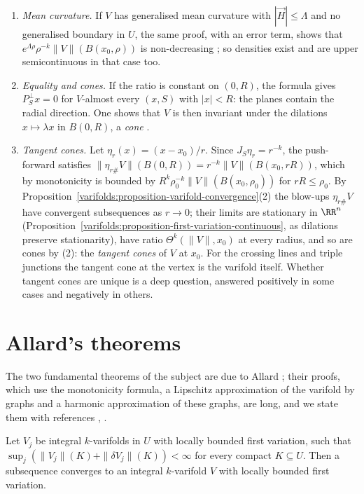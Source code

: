 \begin{remark}\label{varifolds:remark-monotonicity}
\begin{enumerate}
\item \emph{Mean curvature.} If $V$ has generalised mean curvature with $|\vec{H}| \leq \Lambda$ and no generalised boundary in $U$, the same proof, with an error term, shows that
$e^{\Lambda\rho}\rho^{-k}\|V\|(B(x_0, \rho))$ is non-decreasing \cite{simon-gmt}; so densities exist and are upper semicontinuous in that case too.
\item \emph{Equality and cones.} If the ratio is constant on $(0, R)$, the formula gives $P_S^\perp x = 0$ for $V$-almost every $(x, S)$ with $|x| < R$: the planes contain the radial direction. One shows that
$V$ is then invariant under the dilations $x \mapsto \lambda x$ in $B(0, R)$, a \emph{cone} \cite{simon-gmt}.
\item \emph{Tangent cones.} Let $\eta_r(x) = (x - x_0)/r$. Since $J_S\eta_r = r^{-k}$, the push-forward satisfies $\|\eta_{r\#}V\|(B(0, R)) = r^{-k}\|V\|(B(x_0, rR))$, which by monotonicity is bounded by
$R^k\rho_0^{-k}\|V\|(B(x_0, \rho_0))$ for $rR \leq \rho_0$. By Proposition~\ref{varifolds:proposition-varifold-convergence}(2) the blow-ups $\eta_{r\#}V$ have convergent subsequences as $r \to 0$; their limits
are stationary in $\RR^n$ (Proposition~\ref{varifolds:proposition-first-variation-continuous}, as dilations preserve stationarity), have ratio $\Theta^k(\|V\|, x_0)$ at every radius, and so are cones by (2): the
\emph{tangent cones} of $V$ at $x_0$. For the crossing lines and triple junctions the tangent cone at the vertex is the varifold itself. Whether tangent cones are unique is a deep question, answered
positively in some cases and negatively in others.
\end{enumerate}
\end{remark}

\section{Allard's theorems}\label{varifolds:section-allard}

The two fundamental theorems of the subject are due to Allard \cite{allard-1972}; their proofs, which use the monotonicity formula, a Lipschitz approximation of the varifold by graphs and a harmonic
approximation of these graphs, are long, and we state them with references \cite{allard-1972}, \cite{simon-gmt}.

\begin{theorem}\label{varifolds:theorem-allard-compactness}
Let $V_j$ be integral $k$-varifolds in $U$ with locally bounded first variation, such that $\sup_j(\|V_j\|(K) + \|\delta V_j\|(K)) < \infty$ for every compact $K \subseteq U$. Then a subsequence converges to an
integral $k$-varifold $V$ with locally bounded first variation.
\end{theorem}


